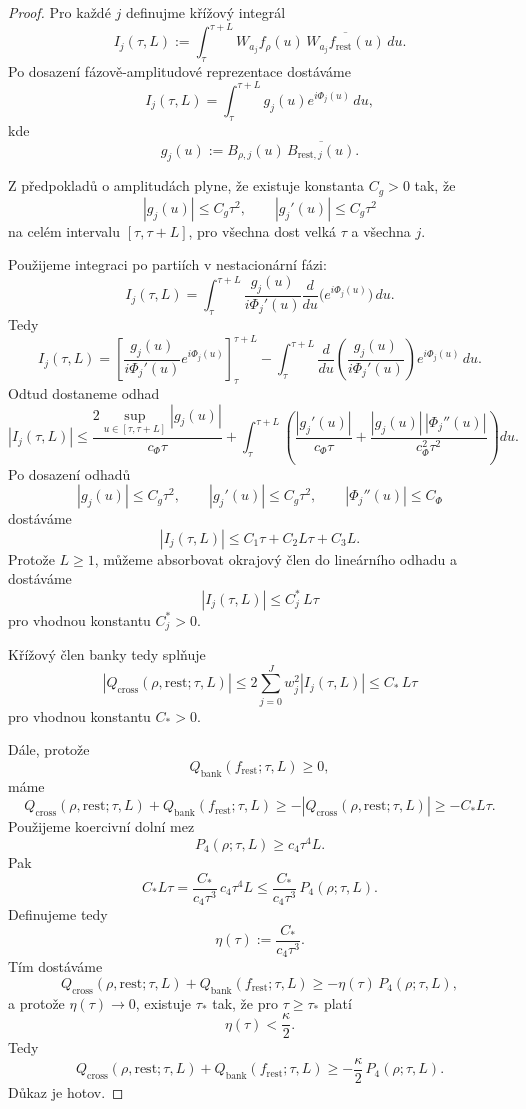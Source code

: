 \documentclass[11pt,a4paper]{article}
\begin{document}
\begin{proof}
Pro každé \(j\) definujme křížový integrál
\[
I_j(\tau,L):=
\int_\tau^{\tau+L}
W_{a_j}f_\rho(u)\,\overline{W_{a_j}f_{\mathrm{rest}}(u)}\,du.
\]
Po dosazení fázově-amplitudové reprezentace dostáváme
\[
I_j(\tau,L)=\int_\tau^{\tau+L} g_j(u)e^{i\Phi_j(u)}\,du,
\]
kde
\[
g_j(u):=B_{\rho,j}(u)\,\overline{B_{\mathrm{rest},j}(u)}.
\]

Z předpokladů o amplitudách plyne, že existuje konstanta \(C_g>0\) tak, že
\[
|g_j(u)|\le C_g \tau^2,
\qquad
|g_j'(u)|\le C_g \tau^2
\]
na celém intervalu \([\tau,\tau+L]\), pro všechna dost velká \(\tau\) a všechna \(j\).

Použijeme integraci po partiích v nestacionární fázi:
\[
I_j(\tau,L)
=
\int_\tau^{\tau+L}
\frac{g_j(u)}{i\Phi_j'(u)}
\frac{d}{du}\bigl(e^{i\Phi_j(u)}\bigr)\,du.
\]
Tedy
\[
I_j(\tau,L)
=
\left[
\frac{g_j(u)}{i\Phi_j'(u)}e^{i\Phi_j(u)}
\right]_{\tau}^{\tau+L}
-
\int_\tau^{\tau+L}
\frac{d}{du}\left(\frac{g_j(u)}{i\Phi_j'(u)}\right)e^{i\Phi_j(u)}\,du.
\]
Odtud dostaneme odhad
\[
|I_j(\tau,L)|
\le
\frac{2\sup_{u\in[\tau,\tau+L]}|g_j(u)|}{c_\Phi\tau}
+
\int_\tau^{\tau+L}
\left(
\frac{|g_j'(u)|}{c_\Phi\tau}
+
\frac{|g_j(u)|\,|\Phi_j''(u)|}{c_\Phi^2\tau^2}
\right)du.
\]
Po dosazení odhadů
\[
|g_j(u)|\le C_g\tau^2,\qquad |g_j'(u)|\le C_g\tau^2,\qquad |\Phi_j''(u)|\le C_\Phi
\]
dostáváme
\[
|I_j(\tau,L)|
\le
C_1\tau + C_2L\tau + C_3L.
\]
Protože \(L\ge 1\), můžeme absorbovat okrajový člen do lineárního odhadu a dostáváme
\[
|I_j(\tau,L)|\le C_j^*\,L\tau
\]
pro vhodnou konstantu \(C_j^*>0\).

Křížový člen banky tedy splňuje
\[
|Q_{\mathrm{cross}}(\rho,\mathrm{rest};\tau,L)|
\le
2\sum_{j=0}^J w_j^2 |I_j(\tau,L)|
\le
C_*\,L\tau
\]
pro vhodnou konstantu \(C_*>0\).

Dále, protože
\[
Q_{\mathrm{bank}}(f_{\mathrm{rest}};\tau,L)\ge 0,
\]
máme
\[
Q_{\mathrm{cross}}(\rho,\mathrm{rest};\tau,L)
+
Q_{\mathrm{bank}}(f_{\mathrm{rest}};\tau,L)
\ge
-|Q_{\mathrm{cross}}(\rho,\mathrm{rest};\tau,L)|
\ge
-C_*L\tau.
\]
Použijeme koercivní dolní mez
\[
P_4(\rho;\tau,L)\ge c_4\tau^4L.
\]
Pak
\[
C_*L\tau
=
\frac{C_*}{c_4\tau^3}\,c_4\tau^4L
\le
\frac{C_*}{c_4\tau^3}\,P_4(\rho;\tau,L).
\]
Definujeme tedy
\[
\eta(\tau):=\frac{C_*}{c_4\tau^3}.
\]
Tím dostáváme
\[
Q_{\mathrm{cross}}(\rho,\mathrm{rest};\tau,L)
+
Q_{\mathrm{bank}}(f_{\mathrm{rest}};\tau,L)
\ge
-\eta(\tau)\,P_4(\rho;\tau,L),
\]
a protože \(\eta(\tau)\to 0\), existuje \(\tau_*\) tak, že pro \(\tau\ge \tau_*\) platí
\[
\eta(\tau)<\frac{\kappa}{2}.
\]
Tedy
\[
Q_{\mathrm{cross}}(\rho,\mathrm{rest};\tau,L)
+
Q_{\mathrm{bank}}(f_{\mathrm{rest}};\tau,L)
\ge
-\frac{\kappa}{2}\,P_4(\rho;\tau,L).
\]
Důkaz je hotov.
\end{proof}
\end{document}
